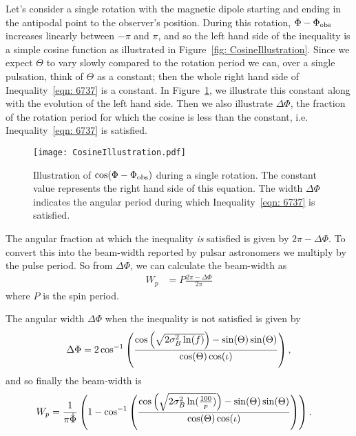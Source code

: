\documentclass[../full_thesis/full_thesis.tex]{subfiles}
\begin{document}
Let's consider a single rotation with the magnetic dipole starting and ending in
the antipodal point to the observer's position. During this rotation, $\Phi -
\Phi_{\mathrm{obs}}$ increases linearly between $-\pi$ and $\pi$, and so the left hand side of the
inequality is a simple cosine function as illustrated in Figure~\ref{fig:
CosineIllustration}.  Since we expect $\Theta$ to vary slowly compared to the
rotation period we can, over a single pulsation, think of $\Theta$ as a
constant; then the whole right hand side of Inequality~\eqref{eqn: 6737} is a
constant. In Figure~\ref{fig: CosineIllustration}, we illustrate this constant
along with the evolution of the left hand side. Then we also illustrate $\Delta\Phi$,
the fraction of the rotation period for which the cosine is less than the
constant, i.e. Inequality~\eqref{eqn: 6737} is satisfied.
\begin{figure}[ht]
\centering
\texttt{[image: CosineIllustration.pdf]}
\caption{Illustration of $\cos(\Phi-\Phi_{\mathrm{obs}})$ during a single rotation. The constant
         value represents the right hand side of this equation. The
         width $\Delta\Phi$ indicates the angular period during which
         Inequality~\eqref{eqn: 6737} is satisfied.}
\label{fig: CosineIllustration}
\end{figure}

The angular fraction at which the inequality \emph{is} satisfied is given by
$2\pi - \Delta\Phi$. To convert this into the beam-width reported by pulsar
astronomers we multiply by the pulse period. So from $\Delta\Phi$, we can
calculate the beam-width as
\begin{align}
    W_{p} & = P \frac{2\pi - \Delta\Phi}{2\pi}
\end{align}
where $P$ is the spin period.

The angular width $\Delta\Phi$ when the inequality is not satisfied is given by
\begin{equation}
    \Delta\Phi = 2\cos^{-1}\left(
                \frac{\cos\left(\sqrt{2\sigma_{B}^{2} \ln(f)}\right) - \sin(\Theta)\sin(\Theta)}
                          {\cos(\Theta)\cos(\iota)}
                      \right),
\end{equation}
and so finally the beam-width is
\begin{align}
    W_{p} & = \frac{1}{\pi \dot{\Phi}}\left(1 -
               \cos^{-1}\left(
                   \frac{\cos\left(\sqrt{2\sigma_{B}^{2} \ln(\frac{100}{p})}\right) - \sin(\Theta)\sin(\Theta)}
                          {\cos(\Theta)\cos(\iota)}
                      \right)
                  \right).
\label{eqn: Wp}
\end{align}
\end{document}
